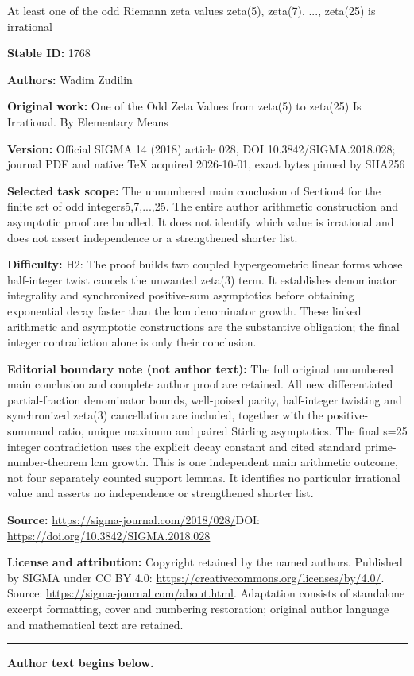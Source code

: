 \documentclass[11pt]{article}
\begin{document}
\begin{center}\Large At least one of the odd Riemann zeta values zeta(5), zeta(7), ..., zeta(25) is irrational\end{center}
\noindent\textbf{Stable ID:} 1768\par
\noindent\textbf{Authors:} Wadim Zudilin\par
\noindent\textbf{Original work:} One of the Odd Zeta Values from zeta(5) to zeta(25) Is Irrational. By Elementary Means\par
\noindent\textbf{Version:} Official SIGMA 14 (2018) article 028, DOI 10.3842/SIGMA.2018.028; journal PDF and native TeX acquired 2026-10-01, exact bytes pinned by SHA256\par
\noindent\textbf{Selected task scope:} The unnumbered main conclusion of Section4 for the finite set of odd integers5,7,...,25. The entire author arithmetic construction and asymptotic proof are bundled. It does not identify which value is irrational and does not assert independence or a strengthened shorter list.\par
\noindent\textbf{Difficulty:} H2: The proof builds two coupled hypergeometric linear forms whose half-integer twist cancels the unwanted zeta(3) term. It establishes denominator integrality and synchronized positive-sum asymptotics before obtaining exponential decay faster than the lcm denominator growth. These linked arithmetic and asymptotic constructions are the substantive obligation; the final integer contradiction alone is only their conclusion.\par
\noindent\textbf{Editorial boundary note (not author text):} The full original unnumbered main conclusion and complete author proof are retained. All new differentiated partial-fraction denominator bounds, well-poised parity, half-integer twisting and synchronized zeta(3) cancellation are included, together with the positive-summand ratio, unique maximum and paired Stirling asymptotics. The final s=25 integer contradiction uses the explicit decay constant and cited standard prime-number-theorem lcm growth. This is one independent main arithmetic outcome, not four separately counted support lemmas. It identifies no particular irrational value and asserts no independence or strengthened shorter list.\par
\noindent\textbf{Source:} \url{https://sigma-journal.com/2018/028/}\quad DOI: \url{https://doi.org/10.3842/SIGMA.2018.028}\par
\noindent\textbf{License and attribution:} Copyright retained by the named authors. Published by SIGMA under CC BY 4.0: \url{https://creativecommons.org/licenses/by/4.0/}. Source: \url{https://sigma-journal.com/about.html}. Adaptation consists of standalone excerpt formatting, cover and numbering restoration; original author language and mathematical text are retained.\par
\medskip\hrule\medskip\noindent\textbf{Author text begins below.}\par
\setcounter{section}{0}
\setcounter{subsection}{0}
\setcounter{subsubsection}{0}
\setcounter{equation}{0}
\end{document}

